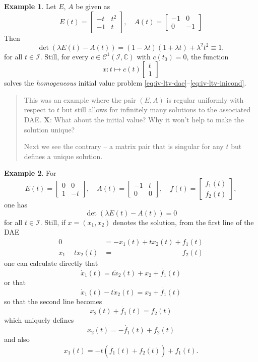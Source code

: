 \documentclass[]{book}
\newenvironment {JHSAYS} [0] {\begin{quote}\color{jhsc}} {\end{quote}}
\theoremstyle{definition}
\theoremstyle{definition}
\newtheorem{example}{Example}[chapter]
\theoremstyle{definition}
\theoremstyle{definition}
\theoremstyle{remark}
\begin{document}
\begin{example}
\protect\hypertarget{exm:ltv-regular-infinite-sols}{}{\label{exm:ltv-regular-infinite-sols} }Let \(E\), \(A\) be given as
\[
E(t) = 
\begin{bmatrix}
-t & t^2 \\ -1 & t 
\end{bmatrix}, \quad
A(t) = 
\begin{bmatrix}
-1 & 0 \\ 0& -1
\end{bmatrix}
\]
Then
\[
\det ( \lambda E(t) - A(t)) = (1-\lambda t)(1+\lambda t) + \lambda ^2 t^2 \equiv 1,
\]
for all \(t\in \mathcal I\). Still, for every \(c \in \mathcal C^1(\mathcal I, \mathbb C)\) with \(c(t_0)=0\), the function
\[
x\colon t \mapsto c(t)\begin{bmatrix} t\\1 \end{bmatrix}
\]
solves the \emph{homogeneous} initial value problem \eqref{eq:iv-ltv-dae}--\eqref{eq:iv-ltv-inicond}.
\end{example}

\begin{JHSAYS}
This was an example where the pair \((E,A)\) is regular uniformly with
respect to \(t\) but still allows for infinitely many solutions to the
associated DAE. \textbf{X}: What about the initial value? Why it won't
help to make the solution unique?

Next we see the contrary -- a matrix pair that is singular for any \(t\)
but defines a unique solution.
\end{JHSAYS}

\begin{example}
\protect\hypertarget{exm:ltv-singular-unique-sol}{}{\label{exm:ltv-singular-unique-sol} }For
\[
E(t) = 
\begin{bmatrix}
0 & 0 \\ 1 & -t 
\end{bmatrix}, \quad
A(t) = 
\begin{bmatrix}
-1 & t \\ 0&0 
\end{bmatrix}, \quad
f(t) = 
\begin{bmatrix}
f_1(t) \\ f_2(t)
\end{bmatrix}, 
\]
one has
\[
\det ( \lambda E(t) - A(t)) = 0
\]
for all \(t\in \mathcal I\). Still, if \(x=(x_1, x_2)\) denotes the solution, from the first line of the DAE
\begin{align*}
0 &= -x_1(t) + tx_2(t) + f_1(t) \\
\dot x_1 - t\dot x_2(t) &= \phantom{-x_1(t) + tx_2(t) +}f_2(t)
\end{align*}
one can calculate directly that
\[
\dot x_1(t) = t\dot x_2(t) +x_2 + \dot{f_1}(t)
\]
or that
\[
\dot x_1(t) - t\dot x_2(t) = x_2 + \dot{f_1}(t)
\]
so that the second line becomes
\[
x_2(t) +  \dot{f_1}(t) = f_2(t)
\]
which uniquely defines
\[
x_2(t) =  - \dot{f_1}(t) + f_2(t)
\]
and also
\[
x_1(t) =  - t(\dot{f_1}(t) + f_2(t))+f_1(t).
\]
\end{example}
\end{document}
